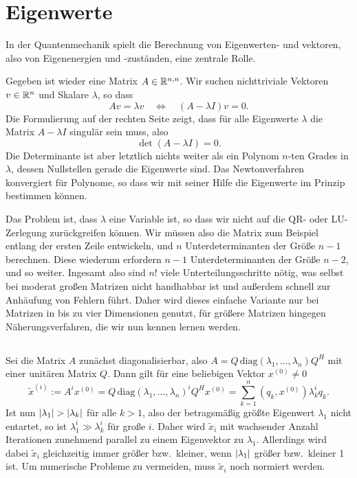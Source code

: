 \section{Eigenwerte}

In der Quantenmechanik spielt die Berechnung von Eigenwerten- und
vektoren, also von Eigenenergien und -zuständen, eine zentrale Rolle.

Gegeben ist wieder eine Matrix $A\in\mathbb{R}^{n,n}$. Wir suchen
nichttriviale Vektoren $v\in\mathbb{R}^n$ und Skalare $\lambda$, so dass
\begin{equation}
  Av = \lambda v \quad\iff\quad (A-\lambda I)v = 0.
\end{equation}
Die Formulierung auf der rechten Seite zeigt, dass für alle Eigenwerte
$\lambda$ die Matrix $A-\lambda I$ singulär sein muss, also
\begin{equation}
  \det (A-\lambda I) = 0.
\end{equation}
Die Determinante ist aber letztlich nichts weiter als ein Polynom
$n$-ten Grades in $\lambda$, dessen Nullstellen gerade die Eigenwerte
sind. Das Newtonverfahren konvergiert für Polynome, so dass wir mit
seiner Hilfe die Eigenwerte im Prinzip bestimmen können.

Das Problem ist, dass $\lambda$ eine Variable ist, so dass wir nicht
auf die QR- oder LU-Zerlegung zurückgreifen können. Wir müssen also
die Matrix zum Beispiel entlang der ersten Zeile entwickeln, und $n$
Unterdeterminanten der Größe $n-1$ berechnen. Diese wiederum erfordern
$n-1$ Unterdeterminanten der Größe $n-2$, und so weiter. Ingesamt also
sind $n!$ viele Unterteilungsschritte nötig, was selbst bei moderat
großen Matrizen nicht handhabbar ist und außerdem schnell zur
Anhäufung von Fehlern führt. Daher wird dieses einfache Variante nur
bei Matrizen in bis zu vier Dimensionen genutzt, für größere Matrizen
hingegen Näherungsverfahren, die wir nun kennen lernen werden.

\subsection{}

Sei die Matrix $A$ zunächst diagonalisierbar, also
$A=Q\,\text{diag}(\lambda_1,\ldots,\lambda_n)Q^H$ mit einer unitären Matrix
$Q$. Dann gilt für eine beliebigen Vektor $x^{(0)}\neq 0$
\begin{equation}
  \tilde{x}^{(i)} := A^i x^{(0)} = Q\,\text{diag}(\lambda_1,\ldots,\lambda_n)^i Q^H x^{(0)}
  = \sum_{k=1}^n (q_k, x^{(0)}) \lambda_k^i q_k.
\end{equation}
Ist nun $\left\lvert{\lambda_1}\right\rvert>\left\lvert{\lambda_k}\right\rvert$ für alle $k>1$, also der
betragsmäßig größte Eigenwert $\lambda_1$ nicht entartet, so ist
$\lambda_1^i\gg\lambda_k^i$ für große $i$. Daher wird $\tilde{x}_i$
mit wachsender Anzahl Iterationen zunehmend parallel zu einem
Eigenvektor zu $\lambda_1$. Allerdings wird dabei $\tilde{x}_i$
gleichzeitig immer größer bzw.\ kleiner, wenn $\left\lvert{\lambda_1}\right\rvert$ größer
bzw.\ kleiner 1 ist. Um numerische Probleme zu vermeiden, muss
$\tilde{x}_i$ noch normiert werden.


